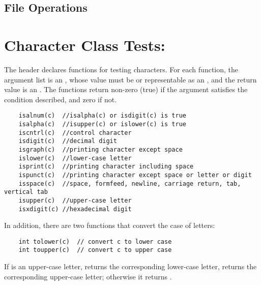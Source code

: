 \subsection{File Operations}

\section{Character Class Tests: }
The header  declares functions for testing characters.
For each function, the argument list is an , whose value must be  or representable as an , and the return value is an .
The functions return non-zero (true) if the argument  satisfies the condition described, and zero if not.
\begin{lstlisting}
	isalnum(c) 	//isalpha(c) or isdigit(c) is true
	isalpha(c) 	//isupper(c) or islower(c) is true
	iscntrl(c) 	//control character
	isdigit(c) 	//decimal digit
	isgraph(c) 	//printing character except space
	islower(c) 	//lower-case letter
	isprint(c) 	//printing character including space
	ispunct(c) 	//printing character except space or letter or digit
	isspace(c) 	//space, formfeed, newline, carriage return, tab, vertical tab
	isupper(c) 	//upper-case letter
	isxdigit(c) //hexadecimal digit
\end{lstlisting}
In addition, there are two functions that convert the case of letters:
\begin{lstlisting}
	int tolower(c) 	// convert c to lower case
	int toupper(c) 	// convert c to upper case
\end{lstlisting}
If  is an upper-case letter,
 returns the corresponding lower-case letter,  returns the corresponding upper-case letter; otherwise it returns .


